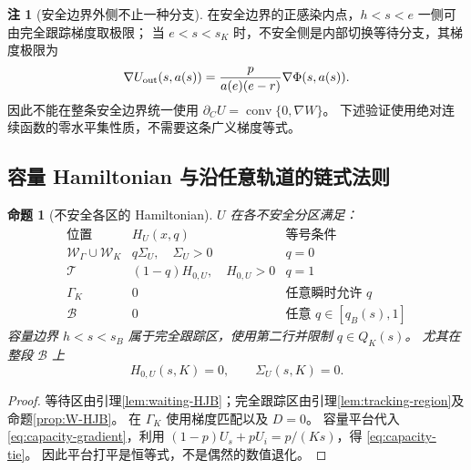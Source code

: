 \documentclass[11pt,a4paper,UTF8]{ctexart}
\newtheorem{proposition}[theorem]{命题}
\theoremstyle{definition}
\newtheorem{remark}[theorem]{注}
\begin{document}
\begin{remark}[安全边界外侧不止一种分支]
\label{rem:safe-gradient}
在安全边界的正感染内点，$h<s<e$ 一侧可由完全跟踪梯度取极限；
当 $e<s<s_K$ 时，不安全侧是内部切换等待分支，其梯度极限为
\[
\nabla U_{\rm out}(s,a(s))=
\frac{p}{a(e)(e-r)}\nabla\Phi(s,a(s)).
\]
因此不能在整条安全边界统一使用
$\partial_C U=\operatorname{conv}\{0,\nabla W\}$。
下述验证使用绝对连续函数的零水平集性质，不需要这条广义梯度等式。
\end{remark}

\subsection{容量 Hamiltonian 与沿任意轨道的链式法则}
\begin{proposition}[不安全各区的 Hamiltonian]
\label{prop:all-HJB}
$U$ 在各不安全分区满足：
\begin{equation}
\begin{array}{c|c|c}
\text{位置}&H_U(x,q)&\text{等号条件}\\\hline
\mathcal W_\Gamma\cup\mathcal W_K&q\Sigma_U,\quad\Sigma_U>0&q=0\\
\mathcal T&(1-q)H_{0,U},\quad H_{0,U}>0&q=1\\
\Gamma_K&0&\text{任意瞬时允许 }q\\
\mathcal B&0&\text{任意 }q\in[q_B(s),1]
\end{array}
\label{eq:HJB-table}
\end{equation}
容量边界 $h<s<s_B$ 属于完全跟踪区，使用第二行并限制 $q\in Q_K(s)$。
尤其在整段 $\mathcal B$ 上
\begin{equation}
\boxed{H_{0,U}(s,K)=0,\qquad\Sigma_U(s,K)=0.}
\label{eq:capacity-tie}
\end{equation}
\end{proposition}
\begin{proof}
等待区由引理\ref{lem:waiting-HJB}；完全跟踪区由引理\ref{lem:tracking-region}及命题\ref{prop:W-HJB}。
在 $\Gamma_K$ 使用梯度匹配以及 $D=0$。
容量平台代入 \eqref{eq:capacity-gradient}，利用
$(1-p)U_s+pU_i=p/(Ks)$，得 \eqref{eq:capacity-tie}。
因此平台打平是恒等式，不是偶然的数值退化。
\end{proof}
\end{document}
